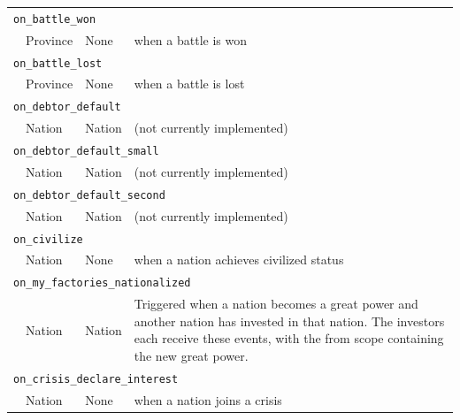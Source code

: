 \begin{longtable}{lllp{6cm}}
\multicolumn{4}{l}{\texttt{on\_battle\_won}} \\ \nopagebreak
 & Province & None & \raggedright when a battle is won\tabularnewline[0.5ex]
\multicolumn{4}{l}{\texttt{on\_battle\_lost}} \\ \nopagebreak
 & Province & None & \raggedright when a battle is lost\tabularnewline[0.5ex]
\multicolumn{4}{l}{\texttt{on\_debtor\_default}} \\ \nopagebreak
 & Nation & Nation & \raggedright (not currently implemented)\tabularnewline[0.5ex]
\multicolumn{4}{l}{\texttt{on\_debtor\_default\_small}} \\ \nopagebreak
 & Nation & Nation & \raggedright (not currently implemented)\tabularnewline[0.5ex]
\multicolumn{4}{l}{\texttt{on\_debtor\_default\_second}} \\ \nopagebreak
 & Nation & Nation & \raggedright (not currently implemented)\tabularnewline[0.5ex]
\multicolumn{4}{l}{\texttt{on\_civilize}} \\ \nopagebreak
 & Nation & None & \raggedright when a nation achieves civilized status\tabularnewline[0.5ex]
\multicolumn{4}{l}{\texttt{on\_my\_factories\_nationalized}} \\ \nopagebreak
 & Nation & Nation & \raggedright Triggered when a nation becomes a great power and another nation has invested in that nation. The investors each receive these events, with the from scope containing the new great power.\tabularnewline[0.5ex]
\multicolumn{4}{l}{\texttt{on\_crisis\_declare\_interest}} \\ \nopagebreak
 & Nation & None & \raggedright when a nation joins a crisis\tabularnewline[0.5ex]
\end{longtable}

